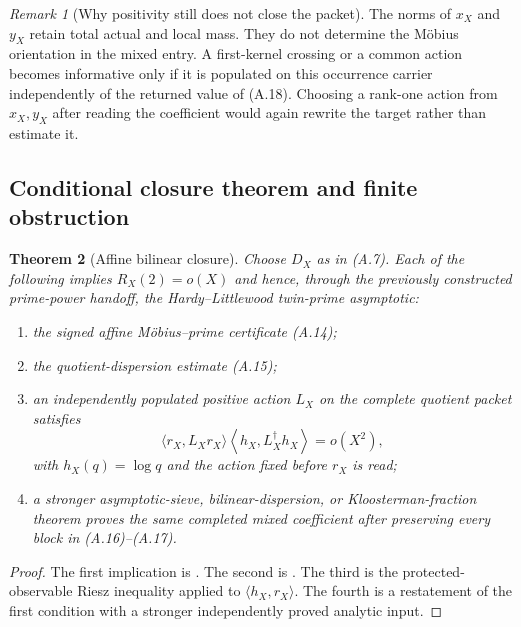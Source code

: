 \documentclass[11pt]{article}
\newtheorem{theorem}{Theorem}[section]
\theoremstyle{definition}
\theoremstyle{remark}
\newtheorem{remark}[theorem]{Remark}
\begin{document}
\begin{remark}[Why positivity still does not close the packet]
The norms of $x_X$ and $y_X$ retain total actual and local mass.  They do not
determine the M\"obius orientation in the mixed entry.  A first-kernel
crossing or a common action becomes informative only if it is populated on
this occurrence carrier independently of the returned value of \textup{(A.18)}.
Choosing a rank-one action from $x_X,y_X$ after reading the coefficient would
again rewrite the target rather than estimate it.
\end{remark}

\subsection{Conditional closure theorem and finite obstruction}
\label{subsec:affouter-closure}

\begin{theorem}[Affine bilinear closure]
\label{thm:affouter-closure}
Choose $D_X$ as in \textup{(A.7)}.  Each of the following implies
$R_X(2)=o(X)$ and hence, through the previously constructed prime-power handoff, the
Hardy--Littlewood twin-prime asymptotic:
\begin{enumerate}[label=\textup{(C\arabic*)},leftmargin=3em]
\item the signed affine M\"obius--prime certificate \textup{(A.14)};
\item the quotient-dispersion estimate \textup{(A.15)};
\item an independently populated positive action $L_X$ on the complete
      quotient packet satisfies
\[
 \boxed{
 \langle r_X,L_Xr_X\rangle
 \left\langle h_X,L_X^{\dagger}h_X\right\rangle
 =o(X^2),}
\]
      with $h_X(q)=\log q$ and the action fixed before $r_X$ is read;
\item a stronger asymptotic-sieve, bilinear-dispersion, or
      Kloosterman-fraction theorem proves the same completed mixed coefficient
      after preserving every block in \textup{(A.16)}--\textup{(A.17)}.
\end{enumerate}
\end{theorem}

\begin{proof}
The first implication is
.  The second is
.  The third is the protected-observable Riesz
inequality applied to $\langle h_X,r_X\rangle$.  The fourth is a restatement
of the first condition with a stronger independently proved analytic input.
\end{proof}
\end{document}
